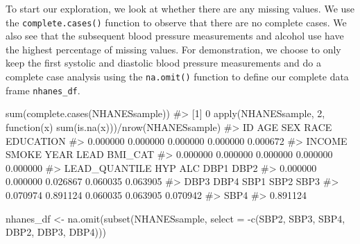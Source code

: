 \documentclass[
  letterpaper,
]{latex/krantz}
\makeatletter
\newenvironment{Shaded}{\begin{snugshade}}{\end{snugshade}}
\newcommand{\AttributeTok}[1]{\textcolor[rgb]{0.40,0.45,0.13}{#1}}
\newcommand{\CommentTok}[1]{\textcolor[rgb]{0.37,0.37,0.37}{#1}}
\newcommand{\ControlFlowTok}[1]{\textcolor[rgb]{0.00,0.23,0.31}{#1}}
\newcommand{\DecValTok}[1]{\textcolor[rgb]{0.68,0.00,0.00}{#1}}
\newcommand{\FunctionTok}[1]{\textcolor[rgb]{0.28,0.35,0.67}{#1}}
\newcommand{\NormalTok}[1]{\textcolor[rgb]{0.00,0.23,0.31}{#1}}
\newcommand{\OtherTok}[1]{\textcolor[rgb]{0.00,0.23,0.31}{#1}}
\newcommand{\SpecialCharTok}[1]{\textcolor[rgb]{0.37,0.37,0.37}{#1}}
\newenvironment{kframe}{%
\medskip{}
\setlength{\fboxsep}{.8em}
 \def\at@end@of@kframe{}%
 \ifinner\ifhmode%
  \def\at@end@of@kframe{\end{minipage}}%
  \begin{minipage}{\columnwidth}%
 \fi\fi%
 \def\FrameCommand##1{\hskip\@totalleftmargin \hskip-\fboxsep
 \colorbox{shadecolor}{##1}\hskip-\fboxsep
     \hskip-\linewidth \hskip-\@totalleftmargin \hskip\columnwidth}%
 \MakeFramed {\advance\hsize-\width
   \@totalleftmargin\z@ \linewidth\hsize
   \@setminipage}}%
 {\par\unskip\endMakeFramed%
 \at@end@of@kframe}
\renewenvironment{Shaded}{\begin{kframe}}{\end{kframe}}
\makeatother
\begin{document}
To start our exploration, we look at whether there are any missing
values. We use the
\texttt{complete.cases()}
function to observe that there are no complete cases. We also see that
the subsequent blood pressure measurements and alcohol use have the
highest percentage of missing values. For demonstration, we choose to
only keep the first systolic and diastolic blood pressure measurements
and do a complete case analysis using the
\texttt{na.omit()}
function to define our complete data frame \texttt{nhanes\_df}.

\begin{Shaded}
\begin{Highlighting}[]
\FunctionTok{sum}\NormalTok{(}\FunctionTok{complete.cases}\NormalTok{(NHANESsample))}
\CommentTok{\#\textgreater{} [1] 0}
\FunctionTok{apply}\NormalTok{(NHANESsample, }\DecValTok{2}\NormalTok{, }\ControlFlowTok{function}\NormalTok{(x) }\FunctionTok{sum}\NormalTok{(}\FunctionTok{is.na}\NormalTok{(x)))}\SpecialCharTok{/}\FunctionTok{nrow}\NormalTok{(NHANESsample)}
\CommentTok{\#\textgreater{}            ID           AGE           SEX          RACE     EDUCATION }
\CommentTok{\#\textgreater{}      0.000000      0.000000      0.000000      0.000000      0.000672 }
\CommentTok{\#\textgreater{}        INCOME         SMOKE          YEAR          LEAD       BMI\_CAT }
\CommentTok{\#\textgreater{}      0.000000      0.000000      0.000000      0.000000      0.000000 }
\CommentTok{\#\textgreater{} LEAD\_QUANTILE           HYP           ALC          DBP1          DBP2 }
\CommentTok{\#\textgreater{}      0.000000      0.000000      0.026867      0.060035      0.063905 }
\CommentTok{\#\textgreater{}          DBP3          DBP4          SBP1          SBP2          SBP3 }
\CommentTok{\#\textgreater{}      0.070974      0.891124      0.060035      0.063905      0.070942 }
\CommentTok{\#\textgreater{}          SBP4 }
\CommentTok{\#\textgreater{}      0.891124}
\end{Highlighting}
\end{Shaded}

\begin{Shaded}
\begin{Highlighting}[]
\NormalTok{nhanes\_df }\OtherTok{\textless{}{-}} \FunctionTok{na.omit}\NormalTok{(}\FunctionTok{subset}\NormalTok{(NHANESsample, }
                            \AttributeTok{select =} \SpecialCharTok{{-}}\FunctionTok{c}\NormalTok{(SBP2, SBP3, SBP4, DBP2, DBP3, }
\NormalTok{                                       DBP4)))}
\end{Highlighting}
\end{Shaded}
\end{document}
